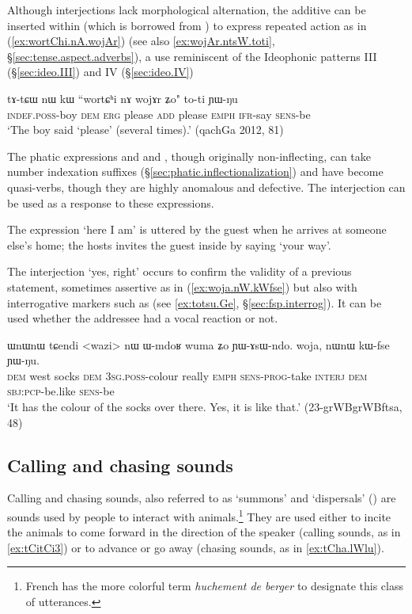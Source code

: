 Although interjections lack morphological alternation, the additive  can be inserted within  (which is borrowed from ) to express repeated action as in (\ref{ex:wortChi.nA.wojAr}) (see also \ref{ex:wojAr.ntsW.toti}, §\ref{sec:tense.aspect.adverbs}), a use reminiscent of the Ideophonic patterns III (§\ref{sec:ideo.III}) and IV (§\ref{sec:ideo.IV})

 \begin{exe}
\ex \label{ex:wortChi.nA.wojAr}
\gll tɤ-tɕɯ nɯ kɯ ``wortɕʰi nɤ wojɤr ʑo" to-ti ɲɯ-ŋu \\
\textsc{indef}.\textsc{poss}-boy \textsc{dem} \textsc{erg} please \textsc{add} please \textsc{emph} \textsc{ifr}-say \textsc{sens}-be \\
\glt `The boy said `please' (several times).' (qachGa 2012, 81)
\end{exe}

The phatic expressions and  and , though originally non-inflecting, can take number indexation suffixes (§\ref{sec:phatic.inflectionalization}) and have become quasi-verbs, though they are highly anomalous and defective. The interjection  can be used as a response to these expressions.

The expression  `here I am' is uttered by the guest when he arrives at someone else's home; the hosts invites the guest inside by saying  `your way'.

The interjection  `yes, right' occurs to confirm the validity of a previous statement, sometimes assertive as in (\ref{ex:woja.nW.kWfse}) but also with interrogative markers such as  (see \ref{ex:totsu.Ge}, §\ref{sec:fsp.interrog}). It can be used whether the addressee had a vocal reaction or not.

\begin{exe}
\ex \label{ex:woja.nW.kWfse}
\gll ɯnɯnɯ tɕendi <wazi> nɯ ɯ-mdoʁ wuma ʑo ɲɯ-ɤsɯ-ndo. woja, nɯnɯ kɯ-fse ɲɯ-ŋu. \\
\textsc{dem} west socks \textsc{dem} \textsc{3sg}.\textsc{poss}-colour really \textsc{emph} \textsc{sens}-\textsc{prog}-take \textsc{interj} \textsc{dem} \textsc{sbj}:\textsc{pcp}-be.like \textsc{sens}-be \\
\glt `It has the colour of the socks over there. Yes, it is like that.' (23-grWBgrWBftsa, 48)
\end{exe} 


\subsection{Calling  and chasing sounds} \label{sec:call}
Calling and chasing sounds, also referred to as `summons' and `dispersals' (\citealt[318--319]{aikhenvald10imperative}) are sounds used by people to interact with animals.\footnote{French has the more colorful term \textit{huchement de berger} to designate this class of utterances.} They are used either to incite the animals to come forward in the direction of the speaker (calling sounds, as in \ref{ex:tCitCi3}) or to advance or go away (chasing sounds, as in \ref{ex:tCha.lWlu}). 

